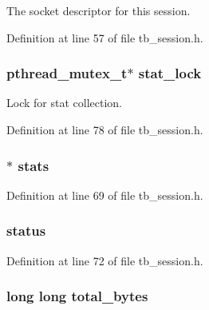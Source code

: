 The socket descriptor for this session. 



Definition at line 57 of file tb\-\_\-session.\-h.

\hypertarget{structtb__session__t_ab828bf6b1b85621025b518a892b79d79}{
\subsubsection[{stat\-\_\-lock}]{\setlength{\rightskip}{0pt plus 5cm}pthread\-\_\-mutex\-\_\-t$\ast$ stat\-\_\-lock}}\label{structtb__session__t_ab828bf6b1b85621025b518a892b79d79}


Lock for stat collection. 



Definition at line 78 of file tb\-\_\-session.\-h.

\hypertarget{structtb__session__t_a464593aa6d4c80e0f689c501c4e81e8c}{
\subsubsection[{stats}]{$\ast$ stats}}\label{structtb__session__t_a464593aa6d4c80e0f689c501c4e81e8c}


Definition at line 69 of file tb\-\_\-session.\-h.

\hypertarget{structtb__session__t_a92613ed83a3cc0d2644758af475d9782}{
\subsubsection[{status}]{ status}}\label{structtb__session__t_a92613ed83a3cc0d2644758af475d9782}


Definition at line 72 of file tb\-\_\-session.\-h.

\hypertarget{structtb__session__t_af8b7f35061eb6fd4b3cda13b50755b89}{
\subsubsection[{total\-\_\-bytes}]{\setlength{\rightskip}{0pt plus 5cm}long long total\-\_\-bytes}}\label{structtb__session__t_af8b7f35061eb6fd4b3cda13b50755b89}


